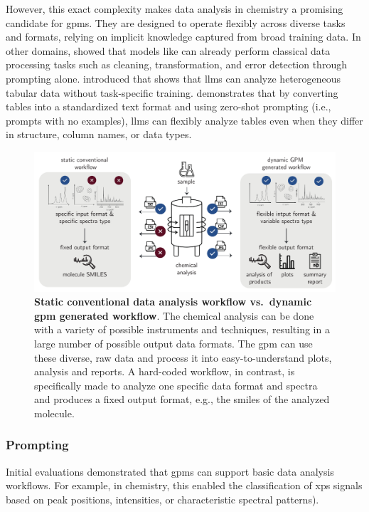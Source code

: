 However, this exact complexity makes data analysis in chemistry a promising candidate for \glspl{gpm}. 
They are designed to operate flexibly across diverse tasks and formats, relying on implicit knowledge captured from broad training data. 
In other domains, \textcite{narayan2022can} showed that models like  can already perform classical data processing tasks such as cleaning, transformation, and error detection through prompting alone. \textcite{kayali2023chorus} introduced  that shows that \glspl{llm} can analyze heterogeneous tabular data without task-specific training. 
 demonstrates that by converting tables into a standardized text format and using zero-shot prompting (i.e., prompts with no examples), \glspl{llm} can flexibly analyze tables even when they differ in structure, column names, or data types.

\begin{figure}[!ht]
    \centering
\includegraphics[width=1\textwidth]{figures/rescaled_figures/chemrev_figure17.pdf}
    \caption{\textbf{Static conventional data analysis workflow vs.\ dynamic \gls{gpm} generated workflow}. The chemical analysis can be done with a variety of possible instruments and techniques, resulting in a large number of possible output data formats. The \gls{gpm} can use these diverse, raw data and process it into easy-to-understand plots, analysis and reports. A hard-coded workflow, in contrast, is specifically made to analyze one specific data format and spectra and produces a fixed output format, e.g., the \gls{smiles} of the analyzed molecule.}
    \label{fig:anaylsis}
\end{figure}


 \subsubsection{Prompting} Initial evaluations demonstrated that \glspl{gpm} can support basic data analysis workflows. \autocite{Fu2025large} 
 For example, in chemistry, this enabled the classification of \gls{xps} signals \autocite{decurt2024large} based on peak positions, intensities, or characteristic spectral patterns).  
 
